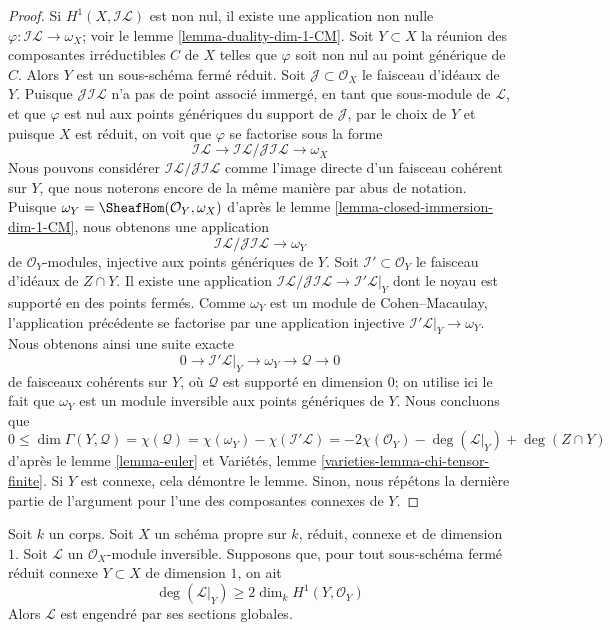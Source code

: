 \begin{proof}
Si $H^1(X, \mathcal{I}\mathcal{L})$ est non nul, il existe une application non nulle $\varphi : \mathcal{I}\mathcal{L} \to \omega_X$; voir le lemme \ref{lemma-duality-dim-1-CM}. Soit $Y \subset X$ la réunion des composantes irréductibles $C$ de $X$ telles que $\varphi$ soit non nul au point générique de $C$. Alors $Y$ est un sous-schéma fermé réduit. Soit $\mathcal{J} \subset \mathcal{O}_X$ le faisceau d'idéaux de $Y$. Puisque $\mathcal{J}\mathcal{I}\mathcal{L}$ n'a pas de point associé immergé, en tant que sous-module de $\mathcal{L}$, et que $\varphi$ est nul aux points génériques du support de $\mathcal{J}$, par le choix de $Y$ et puisque $X$ est réduit, on voit que $\varphi$ se factorise sous la forme $$
\mathcal{I}\mathcal{L} \to
\mathcal{I}\mathcal{L}/\mathcal{J}\mathcal{I}\mathcal{L} \to \omega_X
$$ Nous pouvons considérer $\mathcal{I}\mathcal{L}/\mathcal{J}\mathcal{I}\mathcal{L}$ comme l'image directe d'un faisceau cohérent sur $Y$, que nous noterons encore de la même manière par abus de notation. Puisque $\omega_Y = \SheafHom(\mathcal{O}_Y, \omega_X)$ d'après le lemme \ref{lemma-closed-immersion-dim-1-CM}, nous obtenons une application $$
\mathcal{I}\mathcal{L}/
\mathcal{J}\mathcal{I}\mathcal{L} 
\to \omega_Y
$$ de $\mathcal{O}_Y$-modules, injective aux points génériques de $Y$. Soit $\mathcal{I}' \subset \mathcal{O}_Y$ le faisceau d'idéaux de $Z \cap Y$. Il existe une application $\mathcal{I}\mathcal{L}/\mathcal{J}\mathcal{I}\mathcal{L} \to
\mathcal{I}'\mathcal{L}|_Y$ dont le noyau est supporté en des points fermés. Comme $\omega_Y$ est un module de Cohen--Macaulay, l'application précédente se factorise par une application injective $\mathcal{I}'\mathcal{L}|_Y \to
\omega_Y$. Nous obtenons ainsi une suite exacte $$
0 \to \mathcal{I}'\mathcal{L}|_Y \to \omega_Y \to \mathcal{Q} \to 0
$$ de faisceaux cohérents sur $Y$, où $\mathcal{Q}$ est supporté en dimension $0$; on utilise ici le fait que $\omega_Y$ est un module inversible aux points génériques de $Y$. Nous concluons que $$
0 \leq \dim \Gamma(Y, \mathcal{Q}) =
\chi(\mathcal{Q}) = \chi(\omega_Y) - \chi(\mathcal{I}'\mathcal{L}) =
-2\chi(\mathcal{O}_Y) - \deg(\mathcal{L}|_Y) + \deg(Z \cap Y)
$$ d'après le lemme \ref{lemma-euler} et Variétés, lemme \ref{varieties-lemma-chi-tensor-finite}. Si $Y$ est connexe, cela démontre le lemme. Sinon, nous répétons la dernière partie de l'argument pour l'une des composantes connexes de $Y$.
\end{proof}

\begin{lemma}
\label{lemma-global-generation}
Soit $k$ un corps. Soit $X$ un schéma propre sur $k$, réduit, connexe et de dimension $1$. Soit $\mathcal{L}$ un $\mathcal{O}_X$-module inversible. Supposons que, pour tout sous-schéma fermé réduit connexe $Y \subset X$ de dimension $1$, on ait $$
\deg(\mathcal{L}|_Y) \geq 2\dim_k H^1(Y, \mathcal{O}_Y)
$$ Alors $\mathcal{L}$ est engendré par ses sections globales.
\end{lemma}

